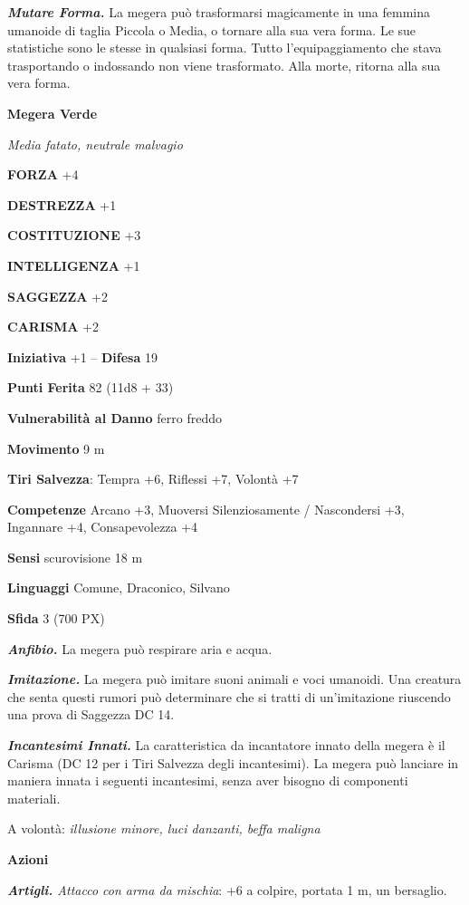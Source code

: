 \begin{multicols}{2}
\textit{\textbf{Mutare Forma.}} La megera può trasformarsi magicamente in una femmina umanoide di taglia Piccola o Media, o tornare alla sua vera forma. Le sue statistiche sono le stesse in qualsiasi forma. Tutto l'equipaggiamento che stava trasportando o indossando non viene trasformato. Alla morte, ritorna alla sua vera forma.



\medskip{}\textbf{Megera Verde}

\textit{Media fatato, neutrale malvagio}

\textbf{FORZA} +4

\textbf{DESTREZZA} +1

\textbf{COSTITUZIONE} +3

\textbf{INTELLIGENZA} +1

\textbf{SAGGEZZA} +2

\textbf{CARISMA} +2

\textbf{Iniziativa} +1 -- \textbf{Difesa} 19

\textbf{Punti Ferita} 82 (11d8 + 33)

\textbf{Vulnerabilità al Danno} ferro freddo

\textbf{Movimento} 9 m

\textbf{Tiri Salvezza}: Tempra +6, Riflessi +7, Volontà +7

\textbf{Competenze} Arcano +3, Muoversi Silenziosamente / Nascondersi +3, Ingannare +4, Consapevolezza +4

\textbf{Sensi} scurovisione 18 m

\textbf{Linguaggi} Comune, Draconico, Silvano

\textbf{Sfida} 3 (700 PX)

\textit{\textbf{Anfibio.}} La megera può respirare aria e acqua.

\textit{\textbf{Imitazione.}} La megera può imitare suoni animali e voci umanoidi. Una creatura che senta questi rumori può determinare che si tratti di un'imitazione riuscendo una prova di Saggezza DC 14.

\textit{\textbf{Incantesimi Innati.}} La caratteristica da incantatore innato della megera è il Carisma (DC 12 per i Tiri Salvezza degli incantesimi). La megera può lanciare in maniera innata i seguenti incantesimi, senza aver bisogno di componenti materiali.

A volontà: \textit{illusione minore, luci danzanti, beffa maligna}

\textbf{Azioni}

\textit{\textbf{Artigli.} Attacco con arma da mischia}: +6 a colpire, portata 1 m, un bersaglio.


\end{multicols}
